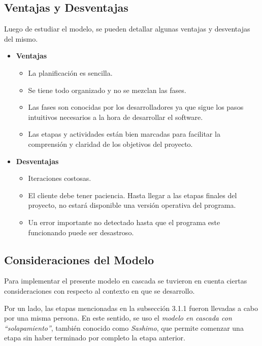 \subsection{Ventajas y Desventajas}
\par Luego de estudiar el modelo, se pueden detallar algunas ventajas y desventajas del mismo.
\begin{itemize}
    \item \textbf{Ventajas} 
	    \begin{itemize}    	
	    	\item La planificación es sencilla.
	    	\item Se tiene todo organizado y no se mezclan las fases.
	    	\item Las fases son conocidas por los desarrolladores ya que sigue los pasos intuitivos necesarios a la hora de desarrollar el software.
	    	\item Las etapas y actividades están bien marcadas para facilitar la comprensión y claridad de los objetivos del proyecto.
	    \end{itemize}
	  
	\item \textbf{Desventajas}
		\begin{itemize}
			\item Iteraciones costosas.
			\item El cliente debe tener paciencia. Hasta llegar a las etapas finales del proyecto, no estará disponible una versión operativa del programa. 
			\item Un error importante no detectado hasta que el
            programa este funcionando puede ser desastroso. 
		\end{itemize}
\end{itemize}

\subsection{Consideraciones del Modelo}
\par Para implementar el presente modelo en cascada se tuvieron en cuenta ciertas consideraciones con respecto al contexto en que se desarrollo.

\par Por un lado, las etapas mencionadas en la subsección 3.1.1 fueron llevadas a cabo por una misma persona. En este sentido, se uso el \emph{modelo en cascada con ``solapamiento''}, también conocido como \emph{Sashimo}\cite{Mcconnell96}, que permite comenzar una etapa sin haber terminado por completo la etapa anterior. 

